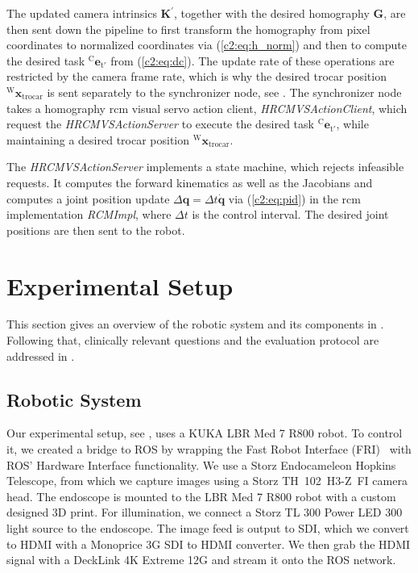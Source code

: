 The updated camera intrinsics $\mathbf{K}^\prime$, together with the desired homography $\mathbf{G}$, are then sent down the pipeline to first transform the homography from pixel coordinates to normalized coordinates via (\eqref{c2:eq:h_norm}) and then to compute the desired task $^\text{C}\mathbf{e}_{\text{t}'}$ from (\eqref{c2:eq:dc}). The update rate of these operations are restricted by the camera frame rate, which is why the desired trocar position $^\text{W}\mathbf{x}_\text{trocar}$ is sent separately to the synchronizer node, see . The synchronizer node takes a homography \acrshort{rcm} visual servo action client, \textit{HRCMVSActionClient}, which request the \textit{HRCMVSActionServer} to execute the desired task $^\text{C}\mathbf{e}_{\text{t}'}$, while maintaining a desired trocar position $^\text{W}\mathbf{x}_\text{trocar}$. 

The \textit{HRCMVSActionServer} implements a state machine, which rejects infeasible requests. It computes the forward kinematics as well as the Jacobians and computes a joint position update $\Delta\mathbf{q}=\Delta t\dot{\mathbf{q}}$ via (\eqref{c2:eq:pid}) in the \acrshort{rcm} implementation \textit{RCMImpl}, where $\Delta t$ is the control interval. The desired joint positions are then sent to the robot.

\section{Experimental Setup}
\label{c2:sec:experimental_setup}

This section gives an overview of the robotic system and its components in . Following that, clinically relevant questions and the evaluation protocol are addressed in .

\subsection{Robotic System}
\label{c2:sec:robotic_system}

Our experimental setup, see , uses a KUKA LBR Med 7 R800 robot. To control it, we created a bridge to ROS by wrapping the Fast Robot Interface (FRI)~\cite{schreiber2010fast} with ROS' Hardware Interface functionality. We use a Storz Endocameleon Hopkins Telescope, from which we capture images using a Storz TH~102~H3-Z~FI camera head. The endoscope is mounted to the LBR Med 7 R800 robot with a custom designed 3D print. For illumination, we connect a Storz TL 300 Power LED 300 light source to the endoscope. The image feed is output to SDI, which we convert to HDMI with a Monoprice 3G SDI to HDMI converter. We then grab the HDMI signal with a DeckLink 4K Extreme 12G and stream it onto the ROS network.

